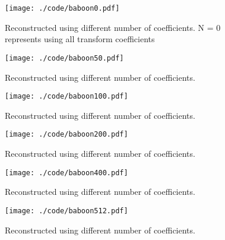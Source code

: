 \documentclass[journal,comsoc]{IEEEtran}
\begin{document}
\begin{figure}[!ht]
  \centering
  \captionsetup{justification=centering}
  \texttt{[image: ./code/baboon0.pdf]}
  \caption{Reconstructed using different number of coefficients. N = 0 represents using all
  transform coefficients}
\label{Fig:baboon0}
\end{figure}

\begin{figure}[!ht]
  \centering
  \captionsetup{justification=centering}
  \texttt{[image: ./code/baboon50.pdf]}
  \caption{Reconstructed using different number of coefficients.}
\label{Fig:baboon50}
\end{figure}

\begin{figure}[!ht]
  \centering
  \captionsetup{justification=centering}
  \texttt{[image: ./code/baboon100.pdf]}
  \caption{Reconstructed using different number of coefficients.}
\label{Fig:baboon100}
\end{figure}

\begin{figure}[!ht]
  \centering
  \captionsetup{justification=centering}
  \texttt{[image: ./code/baboon200.pdf]}
  \caption{Reconstructed using different number of coefficients.}
\label{Fig:baboon200}
\end{figure}

\begin{figure}[!htb]
  \centering
  \captionsetup{justification=centering}
  \texttt{[image: ./code/baboon400.pdf]}
  \caption{Reconstructed using different number of coefficients.}
\label{Fig:baboon400}
\end{figure}

\begin{figure}[!htb]
  \centering
  \captionsetup{justification=centering}
  \texttt{[image: ./code/baboon512.pdf]}
  \caption{Reconstructed using different number of coefficients.}
\label{Fig:baboon512}
\end{figure}
\end{document}
